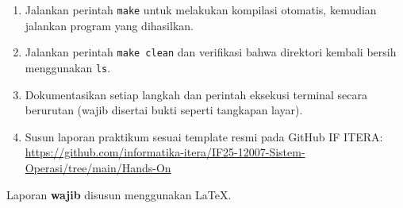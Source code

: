 \begin{enumerate}
	\item Jalankan perintah \texttt{make} untuk melakukan kompilasi otomatis, kemudian jalankan program yang dihasilkan.

	\item Jalankan perintah \texttt{make clean} dan verifikasi bahwa direktori kembali bersih menggunakan \texttt{ls}.

	\item Dokumentasikan setiap langkah dan perintah eksekusi terminal secara berurutan (wajib disertai bukti seperti tangkapan layar).

	\item Susun laporan praktikum sesuai template resmi pada GitHub IF ITERA:
	      \url{https://github.com/informatika-itera/IF25-12007-Sistem-Operasi/tree/main/Hands-On}
\end{enumerate}

Laporan \textbf{wajib} disusun menggunakan \LaTeX.